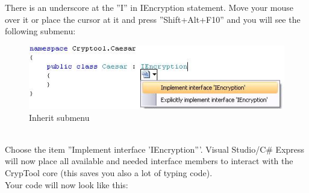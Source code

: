 There is an underscore at the ''I'' in IEncryption statement. Move your mouse over it or place the cursor at it and press ''Shift+Alt+F10'' and you will see the following submenu:
\begin{figure}[h!]
	\centering
		\includegraphics{figures/inherit_submenu.jpg}
	\caption{Inherit submenu}
	\label{fig:inherit_submenu}
\end{figure}\\
Choose the item ''Implement interface 'IEncryption'''. Visual Studio/C\# Express will now place all available and needed interface members to interact with the CrypTool core (this saves you also a lot of typing code).\\
Your code will now look like this:
